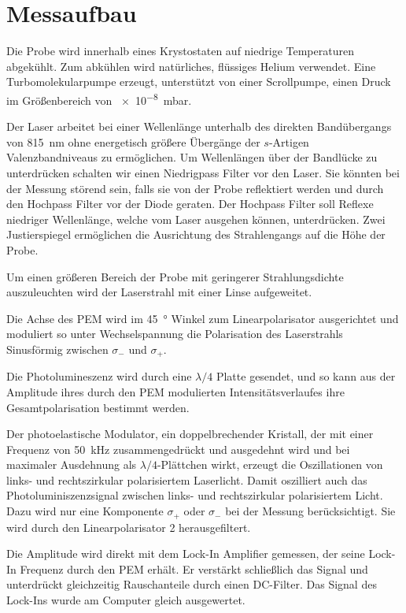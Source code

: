\documentclass[11pt,twoside=true]{scrartcl}
\begin{document}
\section{Messaufbau}

Die Probe wird innerhalb eines Krystostaten auf niedrige Temperaturen
abgekühlt. Zum abkühlen wird natürliches, flüssiges Helium verwendet. Eine
Turbomolekularpumpe erzeugt, unterstützt von einer Scrollpumpe, einen Druck
im Größenbereich von \SI{e-8}{\milli\bar}.

Der Laser arbeitet bei einer Wellenlänge unterhalb des direkten Band\-übergangs
von \SI{815}{\nano\metre} ohne energetisch größere Übergänge der $s$-Artigen
Valenzbandniveaus zu ermöglichen.  Um Wellenlängen über der Bandlücke zu
unterdrücken schalten wir einen Niedrigpass Filter vor den Laser. Sie könnten
bei der Messung störend sein, falls sie von der Probe reflektiert werden und
durch den Hochpass Filter vor der Diode geraten. Der Hochpass Filter soll
Reflexe niedriger Wellenlänge, welche vom Laser ausgehen können, unterdrücken.
Zwei Justierspiegel ermöglichen die Ausrichtung des Strahlengangs auf die Höhe
der Probe. 

Um einen größeren Bereich der Probe mit geringerer Strahlungsdichte
auszuleuchten wird der Laserstrahl mit einer Linse aufgeweitet.

Die Achse des PEM wird im \SI{45}{\degree} Winkel zum Linearpolarisator
ausgerichtet und moduliert so unter Wechselspannung die Polarisation des
Laserstrahls Sinusförmig zwischen $\sigma_-$ und $\sigma_+$.

Die Photolumineszenz wird durch eine $\lambda/4$ Platte gesendet, und so kann
aus der Amplitude ihres durch den PEM modulierten Intensitätsverlaufes ihre
Gesamtpolarisation bestimmt werden.

Der photoelastische Modulator, ein doppelbrechender Kristall, der mit einer
Frequenz von \SI{50}{\kilo\hertz} zusammengedrückt und ausgedehnt wird und bei
maximaler Ausdehnung als $\lambda/4$-Plättchen wirkt, erzeugt die Oszillationen
von links- und rechtszirkular polarisiertem Laserlicht. Damit oszilliert auch
das Photoluminiszenzsignal zwischen links- und rechtszirkular polarisiertem
Licht.  Dazu wird nur eine Komponente $\sigma_+$ oder $\sigma_-$ bei der
Messung berücksichtigt. Sie wird durch den Linearpolarisator 2 herausgefiltert.

Die Amplitude wird direkt mit dem Lock-In Amplifier gemessen, der seine Lock-In
Frequenz durch den PEM erhält.  Er verstärkt schließlich das Signal und
unterdrückt gleichzeitig Rauschanteile durch einen DC-Filter. Das Signal des
Lock-Ins wurde am Computer gleich ausgewertet.
\end{document}
